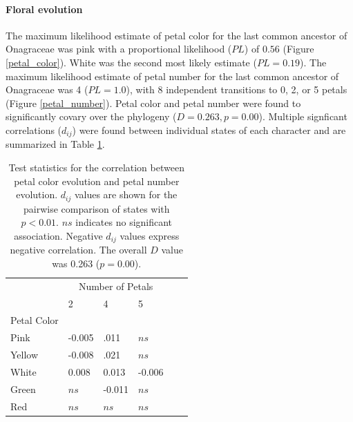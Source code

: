 \documentclass[review]{elsarticle}
\begin{document}
\paragraph{Floral evolution}
The maximum likelihood estimate of petal color for the 
last common ancestor of Onagraceae was pink 
with a proportional likelihood ($PL$) of $0.56$ (Figure \ref{petal_color}).
White was the second most likely estimate ($PL=0.19$).
The maximum likelihood estimate of petal number for the
last common ancestor of Onagraceae was 4 ($PL=1.0$), with 8
independent transitions to 0, 2, or 5 petals (Figure \ref{petal_number}).
Petal color and petal number were found to significantly covary over the 
phylogeny ($D=0.263, p=0.00$). Multiple signficant correlations
($d_{ij}$) were found between individual states of each character
and are summarized in Table \ref{correlations}.

\begin{table}
   \center
   \begin{adjustbox}{max width=\textwidth}
      \setlength{\tabcolsep}{20pt}
      \begin{tabular}{llllll}
         \toprule
	 & \multicolumn{3}{c}{Number of Petals} \\
         & 2 & 4 & 5 \\ 
	 \cmidrule{2-4}
	 Petal Color \\
         \hspace{3 mm} Pink & -0.005 & .011 & $ns$ \\
	 \hspace{3 mm} Yellow & -0.008 & .021 & $ns$ \\
	 \hspace{3 mm} White & 0.008 & 0.013 & -0.006 \\
	 \hspace{3 mm} Green & $ns$ & -0.011 & $ns$ \\
	 \hspace{3 mm} Red & $ns$ & $ns$ & $ns$ \\
         \bottomrule
      \end{tabular}
   \end{adjustbox}
   \caption{Test statistics for the correlation between petal color evolution and petal number evolution. 
	    $d_{ij}$ values are shown
            for the pairwise comparison of states with $p< 0.01$. $ns$ indicates no significant
	    association. Negative $d_{ij}$ values express negative correlation.
	    The overall $D$ value was 0.263 ($p=0.00$).
	    }
   \label{correlations}
\end{table}
\end{document}
